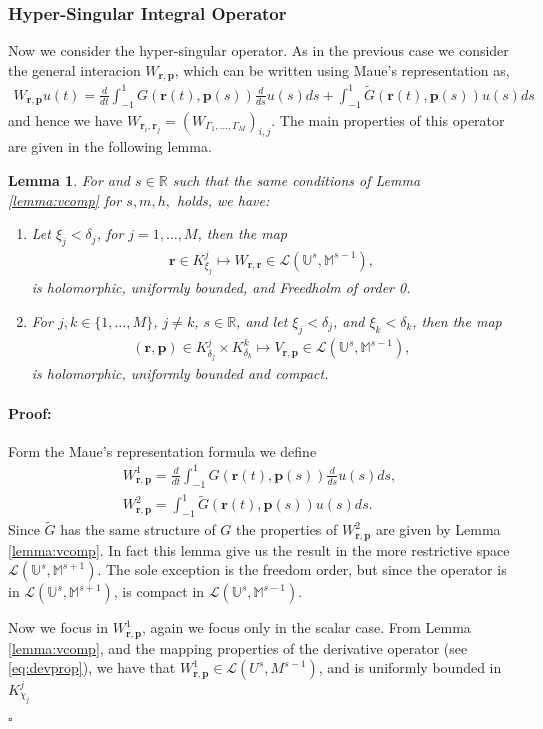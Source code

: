 \documentclass{article}
\newtheorem{lemma}[theorem]{Lemma}
\newenvironment{proof}{\paragraph{Proof:}}{\hfill$\square$}
\newcommand{\IM}{{\mathbb M}}
\newcommand{\IR}{{\mathbb R}}
\newcommand{\IU}{{\mathbb U}}
\newcommand{\bp}{{\bm p}}
\newcommand{\br}{\bm{r}}
\begin{document}
\subsubsection{Hyper-Singular Integral Operator}

Now we consider the hyper-singular operator. As in the previous case we consider the general interacion $W_{\br,\bp}$, which can be written using Maue's representation as, 
\begin{align*}
W_{\br,\bp} u (t)= \frac{d}{dt}
 \int_{-1}^1 G(\br(t),\bp(s))\frac{d}{ds}u(s) ds + \int_{-1}^1\widetilde{G}(\br(t),\bp(s))u(s)ds
 \end{align*}
and hence we have $W_{\br_i,\br_j} = (W_{\Gamma_1,\hdots,\Gamma_M})_{i,j}$. The main properties of this operator are given in the following lemma. 

\begin{lemma}
\label{lemma:wcomp}
For and $s\in \IR$ such that the same conditions of Lemma \ref{lemma:vcomp} for $s,m,h,$ holds, we have:
\begin{enumerate}
\item 
Let $\xi_j< \delta_j$, for $j =1,\hdots,M$, then the map
\begin{align*}
\br \in K^j_{\xi_j} \mapsto W_{\br,\br} \in 
\mathcal{L}(\IU^s, \IM^{s-1}), 
\end{align*} 
is holomorphic, uniformly bounded, and Freedholm of order 0. 
\item 
For $j,k \in \{1,\hdots,M\}$, $j \neq k$, $s \in \IR$, and let $\xi_j < \delta_j$, and $\xi_k  < \delta_k$, then the map 
\begin{align*}
  (\br,\bp) \in K^j_{\delta_j} \times K^k_{\delta_k} \mapsto V_{\br,\bp} \in 
\mathcal{L}(\IU^s, \IM^{s-1}),
\end{align*}
is holomorphic, uniformly bounded and compact. 
\end{enumerate}
\end{lemma}

\begin{proof}
Form the Maue's representation formula we define 
\begin{align*}
W^1_{\br,\bp} = \frac{d}{dt}
 \int_{-1}^1 G(\br(t),\bp(s))\frac{d}{ds}u(s) ds,\\
 W^2_{\br,\bp} = \int_{-1}^1\widetilde{G}(\br(t),\bp(s))u(s)ds.
\end{align*}
Since $\widetilde{G}$ has the same structure of $G$ the properties of $ W^2_{\br,\bp}$ are given by Lemma \ref{lemma:vcomp}. In fact this lemma give us the result in the more restrictive space $\mathcal{L}(\mathbb{U}^s,\mathbb{M}^{s+1})$. The sole exception is the freedom order, but since the operator is in $\mathcal{L}(\mathbb{U}^s,\mathbb{M}^{s+1})$, is compact in $\mathcal{L}(\mathbb{U}^s,\mathbb{M}^{s-1})$.

Now we focus in $W^1_{\br,\bp}$, again we focus only in the scalar case. From Lemma \ref{lemma:vcomp}, and the mapping properties of the derivative operator (see \eqref{eq:devprop}), we have that $W^1_{\br,\bp} \in \mathcal{L}(U^{s},M^{s-1})$, and is uniformly bounded in $K^j_{\chi_j}$

\end{proof}
\end{document}
